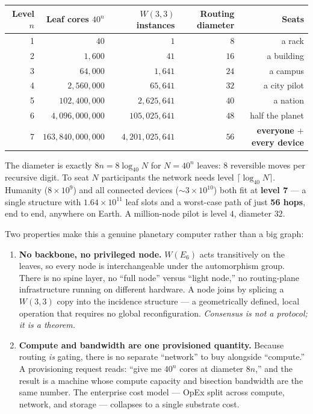 \documentclass[11pt]{article}
\begin{document}
\begin{center}
\begin{tabular}{r r r r r}
\toprule
Level $n$ & Leaf cores $40^n$ & $W(3,3)$ instances & Routing diameter & Seats\\
\midrule
1 & $40$ & $1$ & $8$ & a rack\\
2 & $1{,}600$ & $41$ & $16$ & a building\\
3 & $64{,}000$ & $1{,}641$ & $24$ & a campus\\
4 & $2{,}560{,}000$ & $65{,}641$ & $32$ & a city pilot\\
5 & $102{,}400{,}000$ & $2{,}625{,}641$ & $40$ & a nation\\
6 & $4{,}096{,}000{,}000$ & $105{,}025{,}641$ & $48$ & half the planet\\
7 & $163{,}840{,}000{,}000$ & $4{,}201{,}025{,}641$ & $56$ & \textbf{everyone $+$ every device}\\
\bottomrule
\end{tabular}
\end{center}

The diameter is exactly $8n = 8\log_{40}N$ for $N=40^n$ leaves: $8$ reversible moves per recursive
digit. To seat $N$ participants the network needs level $\lceil\log_{40}N\rceil$. Humanity
($8\times10^9$) and all connected devices ($\sim 3\times10^{10}$) both fit at \textbf{level 7} --- a
single structure with $1.64\times10^{11}$ leaf slots and a worst-case path of just \textbf{56 hops},
end to end, anywhere on Earth. A million-node pilot is level $4$, diameter $32$.

Two properties make this a genuine planetary computer rather than a big graph:

\begin{enumerate}[leftmargin=1.4em]
\item \textbf{No backbone, no privileged node.} $W(E_6)$ acts transitively on the leaves, so every node
is interchangeable under the automorphism group. There is no spine layer, no ``full node'' versus
``light node,'' no routing-plane infrastructure running on different hardware. A node joins by splicing
a $W(3,3)$ copy into the incidence structure --- a geometrically defined, local operation that requires
no global reconfiguration. \emph{Consensus is not a protocol; it is a theorem.}
\item \textbf{Compute and bandwidth are one provisioned quantity.} Because routing \emph{is} gating,
there is no separate ``network'' to buy alongside ``compute.'' A provisioning request reads: ``give me
$40^n$ cores at diameter $8n$,'' and the result is a machine whose compute capacity and bisection
bandwidth are the same number. The enterprise cost model --- OpEx split across compute, network, and
storage --- collapses to a single substrate cost.
\end{enumerate}
\end{document}
